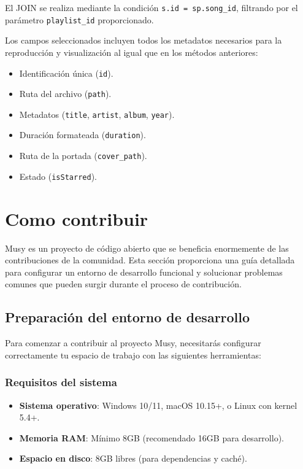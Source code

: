 \documentclass[11pt, a4paper]{article}
\begin{document}
            El JOIN se realiza mediante la condición \texttt{s.id = sp.song\_id}, filtrando por el parámetro \texttt{playlist\_id} proporcionado.

            Los campos seleccionados incluyen todos los metadatos necesarios para la reproducción y visualización al igual que en los métodos anteriores:
            \begin{itemize}
              \item Identificación única (\texttt{id}).
              \item Ruta del archivo (\texttt{path}).
              \item Metadatos (\texttt{title}, \texttt{artist}, \texttt{album}, \texttt{year}).
              \item Duración formateada (\texttt{duration}).
              \item Ruta de la portada (\texttt{cover\_path}).
              \item Estado (\texttt{isStarred}).
            \end{itemize}

\section{Como contribuir}

Musy es un proyecto de código abierto que se beneficia enormemente de las contribuciones de la comunidad. Esta sección proporciona una guía detallada para configurar un entorno de desarrollo funcional y solucionar problemas comunes que pueden surgir durante el proceso de contribución.

  \subsection{Preparación del entorno de desarrollo}

  Para comenzar a contribuir al proyecto Musy, necesitarás configurar correctamente tu espacio de trabajo con las siguientes herramientas:

    \subsubsection{Requisitos del sistema}

    \begin{itemize}
      \item \textbf{Sistema operativo}: Windows 10/11, macOS 10.15+, o Linux con kernel 5.4+.
      \item \textbf{Memoria RAM}: Mínimo 8GB (recomendado 16GB para desarrollo).
      \item \textbf{Espacio en disco}: 8GB libres (para dependencias y caché).
    \end{itemize}
\end{document}
